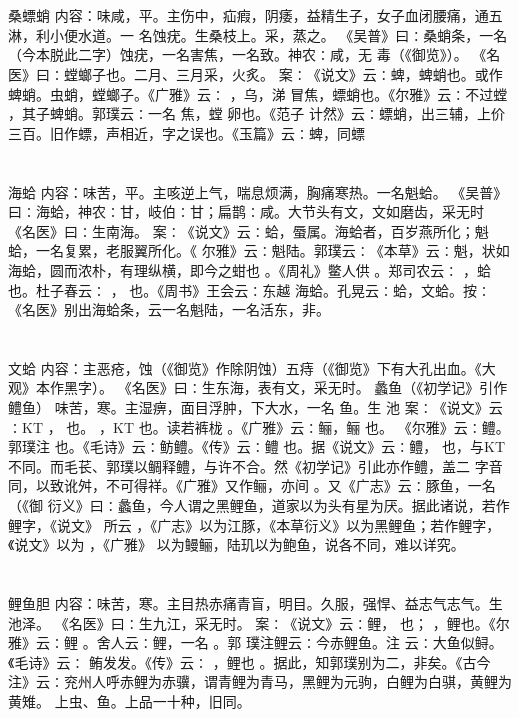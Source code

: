 \documentclass[12pt,UTF8]{ctexbook}
\begin{document}
\chapter{}桑螵蛸
内容：味咸，平。主伤中，疝瘕，阴痿，益精生子，女子血闭腰痛，通五淋，利小便水道。一 
名蚀疣。生桑枝上。采，蒸之。 
《吴普》曰∶桑蛸条，一名（今本脱此二字）蚀疣，一名害焦，一名致。神农∶咸，无 
毒（《御览》）。 
《名医》曰∶螳螂子也。二月、三月采，火炙。 
案∶《说文》云∶蜱，蜱蛸也。或作蜱蛸。虫蛸，螳螂子。《广雅》云∶ ，乌，涕 
冒焦，螵蛸也。《尔雅》云∶不过螳 ，其子蜱蛸。郭璞云∶一名 焦，螳 卵也。《范子 
计然》云∶螵蛸，出三辅，上价三百。旧作螵，声相近，字之误也。《玉篇》云∶蜱，同螵 


\chapter{}海蛤
内容：味苦，平。主咳逆上气，喘息烦满，胸痛寒热。一名魁蛤。 
《吴普》曰∶海蛤，神农∶甘，岐伯∶甘；扁鹊∶咸。大节头有文，文如磨齿，采无时 
《名医》曰∶生南海。 
案∶《说文》云∶蛤，蜃属。海蛤者，百岁燕所化；魁蛤，一名复累，老服翼所化。《 
尔雅》云∶魁陆。郭璞云∶《本草》云∶魁，状如海蛤，圆而浓朴，有理纵横，即今之蚶也 
。《周礼》鳖人供 。郑司农云∶ ，蛤也。杜子春云∶ ， 也。《周书》王会云∶东越 
海蛤。孔晃云∶蛤，文蛤。按∶《名医》别出海蛤条，云一名魁陆，一名活东，非。 


\chapter{}文蛤
内容：主恶疮，蚀（《御览》作除阴蚀）五痔（《御览》下有大孔出血。《大观》本作黑字）。 
《名医》曰∶生东海，表有文，采无时。 
蠡鱼（《初学记》引作鳢鱼） 味苦，寒。主湿痹，面目浮肿，下大水，一名 鱼。生 
池 
案∶《说文》云∶KT ， 也。 ，KT 也。读若裤栊 。《广雅》云∶鲡，鲡 也。 
《尔雅》云∶鳢。郭璞注 也。《毛诗》云∶鲂鳢。《传》云∶鳢 也。据《说文》云∶鳢， 
也，与KT 不同。而毛苌、郭璞以鲷释鳢，与许不合。然《初学记》引此亦作鳢，盖二 
字音同，以致讹舛，不可得祥。《广雅》又作鲡，亦间 。又《广志》云∶豚鱼，一名 （《御 
衍义》曰∶蠡鱼，今人谓之黑鲤鱼，道家以为头有星为厌。据此诸说，若作鲤字，《说文》 
所云 ，《广志》以为江豚，《本草衍义》以为黑鲤鱼；若作鲤字，《说文》以为 ，《广雅》 
以为鳗鲡，陆玑以为鲍鱼，说各不同，难以详究。 


\chapter{}鲤鱼胆
内容：味苦，寒。主目热赤痛青盲，明目。久服，强悍、益志气志气。生池泽。 
《名医》曰∶生九江，采无时。 
案∶《说文》云∶鲤， 也； ，鲤也。《尔雅》云∶鲤 。舍人云∶鲤，一名 。郭 
璞注鲤云∶今赤鲤鱼。注 云∶大鱼似鲟。《毛诗》云∶ 鲔发发。《传》云∶ ，鲤也 
。据此，知郭璞别为二，非矣。《古今 
注》云∶兖州人呼赤鲤为赤骥，谓青鲤为青马，黑鲤为元驹，白鲤为白骐，黄鲤为黄雉。 
上虫、鱼。上品一十种，旧同。 
\end{document}
